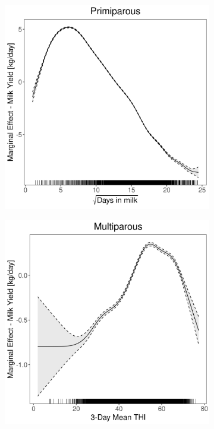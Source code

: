 \begin{figure}[H]
\begin{subfigure}[b]{0.45\textwidth}
    \end{subfigure}
    \hspace{0.05\textwidth} %
    \begin{subfigure}[b]{0.45\textwidth}
        \centering
        \includegraphics[width=\textwidth]{thesis/figures/models/milk/full/ho_milk_full/ho_milk_full_marginal_dim_milk_primi.png}
    \end{subfigure}
    \begin{subfigure}[b]{0.45\textwidth}
        \centering
        \includegraphics[width=\textwidth]{thesis/figures/models/milk/full/ho_milk_full/ho_milk_full_marginal_thi_milk_multi.png}

\end{subfigure}
\end{figure}

